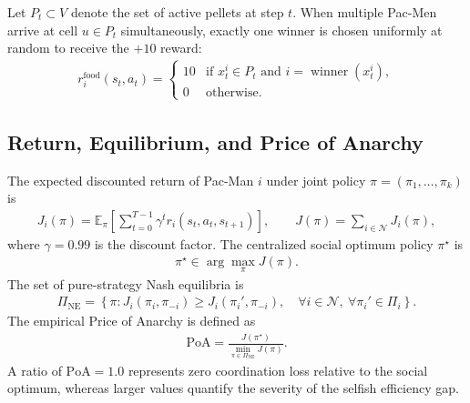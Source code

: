 \documentclass{article}
\newcommand{\N}{\mathcal{N}}
\newcommand{\PoA}{\mathrm{PoA}}
\newcommand{\E}{\mathbb{E}}
\begin{document}
Let $P_t \subset V$ denote the set of active pellets at step $t$. When multiple Pac-Men arrive at cell $u \in P_t$ simultaneously, exactly one winner is chosen uniformly at random to receive the $+10$ reward:
\begin{align}
r_i^{\mathrm{food}}(s_t, a_t) = 
\begin{cases}
10 & \text{if } x_t^i \in P_t \text{ and } i = \operatorname{winner}(x_t^i), \\
0 & \text{otherwise}.
\end{cases}
\end{align}

\subsection{Return, Equilibrium, and Price of Anarchy}

The expected discounted return of Pac-Man $i$ under joint policy $\pi = (\pi_1, \ldots, \pi_k)$ is
\begin{align}
J_i(\pi) = \E_\pi \left[ \sum_{t=0}^{T-1} \gamma^t r_i(s_t, a_t, s_{t+1}) \right], \qquad J(\pi) = \sum_{i\in\N} J_i(\pi),
\label{eq:return}
\end{align}
where $\gamma = 0.99$ is the discount factor. The centralized social optimum policy $\pi^\star$ is
\begin{align}
\pi^\star \in \arg\max_\pi J(\pi).
\label{eq:opt}
\end{align}
The set of pure-strategy Nash equilibria is
\begin{align}
\Pi_{\mathrm{NE}} = \left\{ \pi : J_i(\pi_i, \pi_{-i}) \geq J_i(\pi_i', \pi_{-i}), \quad \forall i \in \N, \ \forall \pi_i' \in \Pi_i \right\}.
\label{eq:ne}
\end{align}
The empirical Price of Anarchy is defined as
\begin{align}
\PoA = \frac{J(\pi^\star)}{\min_{\pi \in \Pi_{\mathrm{NE}}} J(\pi)}.
\label{eq:poa}
\end{align}
A ratio of $\PoA = 1.0$ represents zero coordination loss relative to the social optimum, whereas larger values quantify the severity of the selfish efficiency gap.
\end{document}

